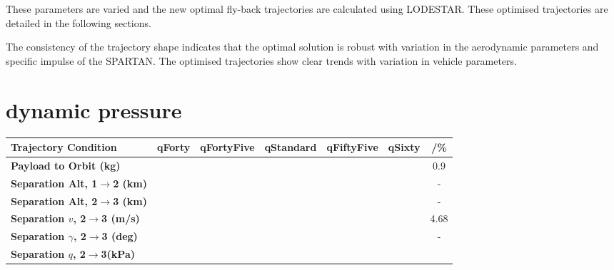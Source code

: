 These parameters are varied and the new optimal fly-back trajectories are calculated using LODESTAR. These optimised trajectories are detailed in the following sections.
 
The consistency of the trajectory shape indicates that the optimal solution is robust with variation in the aerodynamic parameters and specific impulse of the SPARTAN. The optimised trajectories show clear trends with variation in vehicle parameters.






\section{dynamic pressure}
\begin{table}[ht]
\begin{tabular}{l c c c c c c} 
	\hline \textbf{Trajectory Condition}
	&qForty
	&qFortyFive
	&qStandard
	&qFiftyFive
	&qSixty
	& /\%
	\\
	\hline \textbf{Payload to Orbit (kg)}
	& \PayloadToOrbitqForty
	& \PayloadToOrbitqFortyFive
	& \PayloadToOrbitqStandard
	& \PayloadToOrbitqFiftyFive
	& \PayloadToOrbitqSixty
	&0.9
	\\
	\textbf{Separation Alt, 1$\rightarrow$2 (km)}
	& \firstsecondSeparationAltqForty
	& \firstsecondSeparationAltqFortyFive
	& \firstsecondSeparationAltqStandard
	& \firstsecondSeparationAltqFiftyFive
	& \firstsecondSeparationAltqSixty
	& -
	\\
	\textbf{Separation Alt, 2$\rightarrow$3 (km)}
	& \secondthirdSeparationAltqForty
	& \secondthirdSeparationAltqFortyFive
	& \secondthirdSeparationAltqStandard
	& \secondthirdSeparationAltqFiftyFive
	& \secondthirdSeparationAltqSixty
	& -
	\\
	\textbf{Separation $v$, 2$\rightarrow$3 (m/s)}
	& \secondthirdSeparationvqForty
	& \secondthirdSeparationvqFortyFive
	& \secondthirdSeparationvqStandard
	& \secondthirdSeparationvqFiftyFive
	& \secondthirdSeparationvqSixty
	&4.68
	\\
	\textbf{Separation $\gamma$, 2$\rightarrow$3 (deg)}
	& \secondthirdSeparationgammaqForty
	& \secondthirdSeparationgammaqFortyFive
	& \secondthirdSeparationgammaqStandard
	& \secondthirdSeparationgammaqFiftyFive
	& \secondthirdSeparationgammaqSixty
	& -
	\\
	\textbf{Separation $q$, 2$\rightarrow$3(kPa)}
	& \secondthirdSeparationqqForty
	& \secondthirdSeparationqqFortyFive
	& \secondthirdSeparationqqStandard
	& \secondthirdSeparationqqFiftyFive

\end{tabular}
\end{table}

